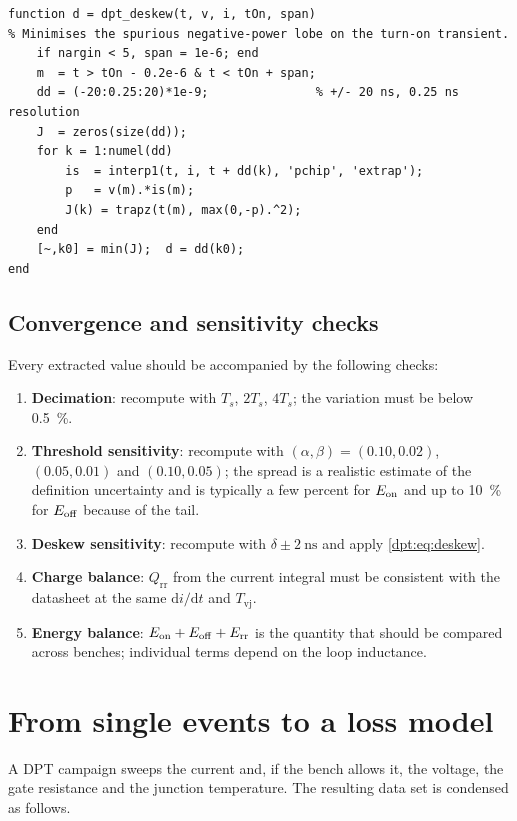 \begin{lstlisting}[caption={Software deskew estimate based on the non-negative power criterion.}]
function d = dpt_deskew(t, v, i, tOn, span)
% Minimises the spurious negative-power lobe on the turn-on transient.
    if nargin < 5, span = 1e-6; end
    m  = t > tOn - 0.2e-6 & t < tOn + span;
    dd = (-20:0.25:20)*1e-9;               % +/- 20 ns, 0.25 ns resolution
    J  = zeros(size(dd));
    for k = 1:numel(dd)
        is  = interp1(t, i, t + dd(k), 'pchip', 'extrap');
        p   = v(m).*is(m);
        J(k) = trapz(t(m), max(0,-p).^2);
    end
    [~,k0] = min(J);  d = dd(k0);
end
\end{lstlisting}

\subsection{Convergence and sensitivity checks}

Every extracted value should be accompanied by the following checks:
\begin{enumerate}
\item \textbf{Decimation}: recompute with $T_s$, $2T_s$, $4T_s$; the variation must be
below \SI{0.5}{\percent}.
\item \textbf{Threshold sensitivity}: recompute with $(\alpha,\beta)=(0.10,0.02)$,
$(0.05,0.01)$ and $(0.10,0.05)$; the spread is a realistic estimate of the definition
uncertainty and is typically a few percent for $E_{\mathrm{on}}$ and up to \SI{10}{\percent} for
$E_{\mathrm{off}}$ because of the tail.
\item \textbf{Deskew sensitivity}: recompute with $\delta \pm \SI{2}{\nano\second}$ and
apply \eqref{dpt:eq:deskew}.
\item \textbf{Charge balance}: $Q_{\mathrm{rr}}$ from the current integral must be
consistent with the datasheet at the same $\mathrm{d}i/\mathrm{d}t$ and $T_{\mathrm{vj}}$.
\item \textbf{Energy balance}: $E_{\mathrm{on}}+E_{\mathrm{off}}+E_{\mathrm{rr}}$ is the quantity that should be compared
across benches; individual terms depend on the loop inductance.
\end{enumerate}

\section{From single events to a loss model}

A DPT campaign sweeps the current and, if the bench allows it, the voltage, the gate
resistance and the junction temperature. The resulting data set is condensed as follows.

